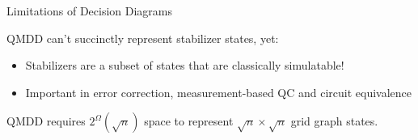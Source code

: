 \begin{frame}[fragile]{Limitations of Decision Diagrams}


%
%  
%
%
%
%
%

\begin{alertblock}{QMDD can't succinctly represent stabilizer states, yet:}
	\begin{itemize}
		\item Stabilizers are a subset of states that are \alert{classically simulatable!}
		\item Important in error correction, measurement-based QC and circuit equivalence
	\end{itemize}
\end{alertblock}


\begin{theorem}%
QMDD requires $2^\Omega({\sqrt{n}})$ space to represent 
	$\sqrt n\times \sqrt n$ grid graph states.
\end{theorem}


\begin{refsection}

\vfill


\end{refsection}
\end{frame}
